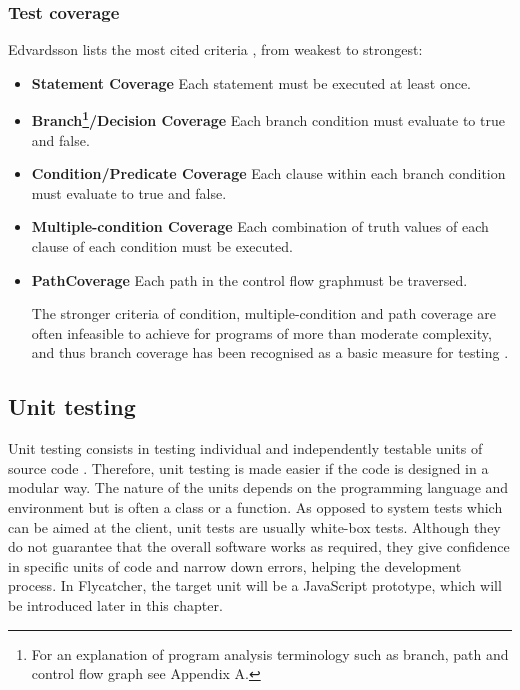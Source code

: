 \documentclass[a4paper,11pt,titlepage]{report}
\begin{document}
\subsubsection{Test coverage}
Edvardsson lists the most cited criteria \cite{edvardsson1999survey}, from weakest to strongest:
\begin{itemize}
	\item \textbf{Statement Coverage} Each statement must be executed at least once.
 	\item \textbf{Branch\footnote{For an explanation of program analysis terminology such as branch, path and control flow graph see Appendix A.}/Decision Coverage} Each branch condition must evaluate to true and false.
 	\item \textbf{Condition/Predicate Coverage} Each clause within each branch condition must evaluate to true and false.
 	\item \textbf{Multiple-condition Coverage} Each combination of truth values of each clause of each condition must be executed.
 	\item \textbf{Path\footnotemark[\value{footnote}] Coverage} Each path in the control flow graph\footnotemark[\value{footnote}] must be traversed.

The stronger criteria of condition, multiple-condition and path coverage are often infeasible to achieve for programs of more than moderate complexity, and thus branch coverage has been recognised as a basic measure for testing \cite{edvardsson1999survey}.
\end{itemize}

\subsection{Unit testing}

Unit testing consists in testing individual and independently testable units of source code \cite{myers2011art}. Therefore, unit testing is made easier if the code is designed in a modular way. The nature of the units depends on the programming language and environment but is often a class or a function. As opposed to system tests which can be aimed at the client, unit tests are usually white-box tests. Although they do not guarantee that the overall software works as required, they give confidence in specific units of code and narrow down errors, helping the development process. In \textsf{Flycatcher}, the target unit will be a JavaScript prototype, which will be introduced later in this chapter.
\end{document}
